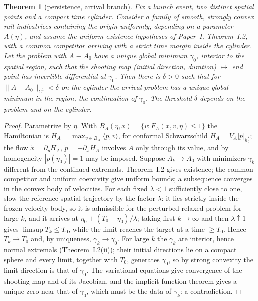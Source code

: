 \documentclass[aip,jmp,amsmath,amssymb,reprint]{revtex4-2}
\theoremstyle{plain}
\newtheorem{theorem}{Theorem}
\theoremstyle{definition}
\begin{document}
\begin{theorem}[persistence, arrival branch]\label{thm:persistence}
Fix a launch event, two distinct spatial points and a compact time cylinder. Consider a
family of smooth, strongly convex rail indicatrices containing the origin uniformly,
depending on a parameter $A(\eta)$, and assume the uniform existence hypotheses of
Paper~I, Theorem~I.2, with a common competitor arriving with a strict time margin inside
the cylinder. Let the problem with $A\equiv A_0$ have a unique global minimum $\gamma_0$,
interior to the spatial region, such that the shooting map (initial direction, duration)
$\mapsto$ end point has invertible differential at $\gamma_0$. Then there is $\delta>0$ such
that for $\|A-A_0\|_{C^1}<\delta$ on the cylinder the arrival problem has a unique global
minimum in the region, the continuation of $\gamma_0$. The threshold $\delta$ depends on the
problem and on the cylinder.
\end{theorem}

\begin{proof}
Parametrize by $\eta$. With $B_A(\eta,x)=\{v:F_A(x,v,\eta)\le1\}$ the Hamiltonian is
$H_A=\max_{v\in B_A}\langle p,v\rangle$, for conformal Schwarzschild
$H_A=V_A|p|_{h_0^*}$; the flow $\dot x=\partial_pH_A$, $\dot p=-\partial_xH_A$ involves $A$
only through its value, and by homogeneity $|p(\eta_0)|=1$ may be imposed. Suppose
$A_k\to A_0$ with minimizers $\gamma_k$ different from the continued extremals. Theorem~I.2
gives existence; the common competitor and uniform coercivity give uniform bounds; a
subsequence converges in the convex body of velocities. For each fixed $\lambda<1$ sufficiently
close to one, slow the reference spatial trajectory by the factor $\lambda$: it lies strictly
inside the frozen velocity body, so it is admissible for the perturbed relaxed problem for
large $k$, and it arrives at $\eta_0+(T_0-\eta_0)/\lambda$; taking first $k\to\infty$ and then
$\lambda\uparrow1$ gives $\limsup T_k\le T_0$, while the limit reaches the target at a time $\ge T_0$. Hence
$T_k\to T_0$ and, by uniqueness, $\gamma_k\to\gamma_0$. For large $k$ the $\gamma_k$ are interior,
hence normal extremals (Theorem~I.2(ii)); their initial directions lie on a compact sphere
and every limit, together with $T_0$, generates $\gamma_0$, so by strong convexity the limit
direction is that of $\gamma_0$. The variational equations give convergence of the shooting
map and of its Jacobian, and the implicit function theorem gives a unique zero near that
of $\gamma_0$, which must be the data of $\gamma_k$: a contradiction.
\end{proof}
\end{document}
